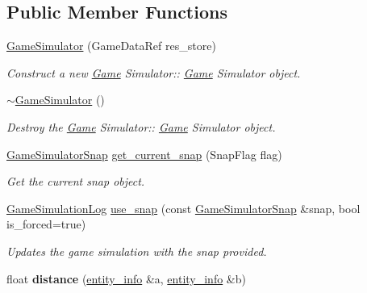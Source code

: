 \subsection*{Public Member Functions}
\begin{DoxyCompactItemize}
\item 
\hyperlink{classcp_1_1_game_simulator_a5f1df55a988bcd5aa19dc37a3f2f64f8}{Game\+Simulator} (Game\+Data\+Ref res\+\_\+store)
\begin{DoxyCompactList}\small\item\em Construct a new \hyperlink{classcp_1_1_game}{Game} Simulator\+:\+: \hyperlink{classcp_1_1_game}{Game} Simulator object. \end{DoxyCompactList}\item 
\mbox{\label{classcp_1_1_game_simulator_a64ab0578e27b01b32c492b3d48676a23}} 
\hyperlink{classcp_1_1_game_simulator_a64ab0578e27b01b32c492b3d48676a23}{$\sim$\+Game\+Simulator} ()
\begin{DoxyCompactList}\small\item\em Destroy the \hyperlink{classcp_1_1_game}{Game} Simulator\+:\+: \hyperlink{classcp_1_1_game}{Game} Simulator object. \end{DoxyCompactList}\item 
\hyperlink{classcp_1_1_game_simulator_snap}{Game\+Simulator\+Snap} \hyperlink{classcp_1_1_game_simulator_a2997be5cd3e69cd47f12cf36739d1c86}{get\+\_\+current\+\_\+snap} (Snap\+Flag flag)
\begin{DoxyCompactList}\small\item\em Get the current snap object. \end{DoxyCompactList}\item 
\hyperlink{classcp_1_1_game_simulation_log}{Game\+Simulation\+Log} \hyperlink{classcp_1_1_game_simulator_af91c09a6455555fdcfd94278e0c85312}{use\+\_\+snap} (const \hyperlink{classcp_1_1_game_simulator_snap}{Game\+Simulator\+Snap} \&snap, bool is\+\_\+forced=true)
\begin{DoxyCompactList}\small\item\em Updates the game simulation with the snap provided. \end{DoxyCompactList}\item 
\mbox{\label{classcp_1_1_game_simulator_aabb25f4078d8fe5a54cea4952da49aa7}} 
float {\bfseries distance} (\hyperlink{classcp_1_1entity__info}{entity\+\_\+info} \&a, \hyperlink{classcp_1_1entity__info}{entity\+\_\+info} \&b)

\end{DoxyCompactItemize}

